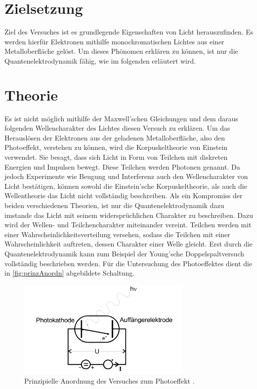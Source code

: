 \section{Zielsetzung}
\label{sec:ziel}

Ziel des Versuches ist es grundlegende Eigenschaften von Licht herauszufinden. Es werden hierfür
Elektronen mithilfe monochromatischen Lichtes aus einer Metalloberfläche gelöst.
Um dieses Phönomen erklären zu können, ist nur die Quantenelektrodynamik fähig, wie im folgenden erläutert wird.

\section{Theorie}
\label{sec:Theorie}

Es ist nicht möglich mithilfe der Maxwell'schen Gleichungen und dem daraus folgenden Wellencharakter des Lichtes diesen Versuch zu erklären.
Um das Herauslösen der Elektronen aus der geladenen Metalloberfläche, also den Photoeffekt, verstehen zu können, wird die Korpuskeltheorie von Einstein verwendet.
Sie besagt, dass sich Licht in Form von Teilchen mit diskreten Energien und Impulsen bewegt. Diese Teilchen werden Photonen genannt.
Da jedoch Experimente wie Beugung und Interferenz auch den Wellencharakter von Licht bestätigen, können sowohl die Einstein'sche Korpuskeltheorie, als auch
die Wellentheorie das Licht nicht vollständig beschreiben. Als ein Kompromiss der beiden verschiedenen Theorien, ist nur die Quantenelektrodynamik dazu
imstande das Licht mit seinem widersprüchlichen Charakter zu beschreiben. Dazu wird der Wellen- und Teilchencharakter miteinander vereint. Teilchen werden mit einer
Wahrscheinlichkeitsverteilung versehen, sodass die Teilchen mit einer Wahrscheinlichkeit auftreten, dessen Charakter einer Welle gleicht.
Erst durch die Quantenelektrodynamik kann zum Beispiel der Young'sche Doppelspaltversuch vollständig beschrieben werden.\newline
Für die Untersuchung des Photoeffektes dient die in \autoref{fig:prinzAnordn} abgebildete Schaltung.

\begin{figure}[H]
    \centering
    \includegraphics[width = 0.75\textwidth]{data/prinzAnordnung.png}
    \caption{Prinzipielle Anordnung des Versuches zum Photoeffekt \cite{Anleitung500}.}
    \label{fig:prinzAnordn}
\end{figure}

